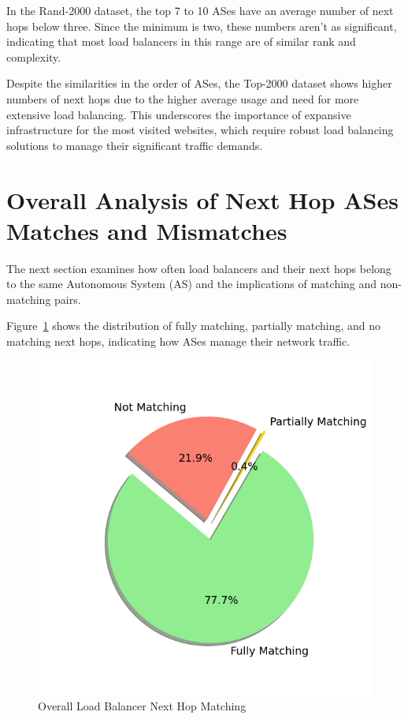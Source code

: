 \documentclass[12pt]{cwru_thesis}
\begin{document}
In the Rand-2000 dataset, the top 7 to 10 ASes have an average number of next hops below three. Since the minimum is two, these numbers aren't as significant, indicating that most load balancers in this range are of similar rank and complexity.

Despite the similarities in the order of ASes, the Top-2000 dataset shows higher numbers of next hops due to the higher average usage and need for more extensive load balancing. This underscores the importance of expansive infrastructure for the most visited websites, which require robust load balancing solutions to manage their significant traffic demands.

\newpage
\section{Overall Analysis of Next Hop ASes Matches and Mismatches}
The next section examines how often load balancers and their next hops belong to the same Autonomous System (AS) and the implications of matching and non-matching pairs.

Figure~\ref{fig:overall_match_mismatch} shows the distribution of fully matching, partially matching, and no matching next hops, indicating how ASes manage their network traffic. 

\begin{figure}[h!]
    \centering
    \includegraphics[scale=0.4]{figures/overall_match_mismatch.png}
    \caption{Overall Load Balancer Next Hop Matching}
    \label{fig:overall_match_mismatch}
\end{figure}
\end{document}
